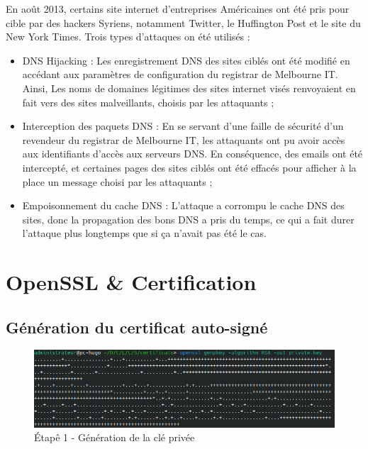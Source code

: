 \documentclass[12pt,a4paper]{article}
\begin{document}
	En août 2013, certains site internet d'entreprises Américaines ont été pris pour cible par des hackers Syriens, notamment Twitter, le Huffington Post et le site du New York Times. Trois types d'attaques on été utilisés : \\
	
	\begin{itemize}
		\item DNS Hijacking : Les enregistrement DNS des sites ciblés ont été modifié en accédant aux paramètres de configuration du registrar de Melbourne IT. Ainsi, Les noms de domaines légitimes des sites internet visés renvoyaient en fait vers des sites malveillants, choisis par les attaquants ; \\
		\item Interception des paquets DNS : En se servant d'une faille de sécurité d'un revendeur du registrar de Melbourne IT, les attaquants ont pu avoir accès aux identifiants d'accès aux serveurs DNS. En conséquence, des emails ont été intercepté, et certaines pages des sites ciblés ont été effacés pour afficher à la place un message choisi par les attaquants ; \\
		\item Empoisonnement du cache DNS : L'attaque a corrompu le cache DNS des sites, donc la propagation des bons DNS a pris du temps, ce qui a fait durer l'attaque plus longtemps que si ça n'avait pas été le cas. \\
	\end{itemize}

	
\newpage

\section{OpenSSL \& Certification}

	\subsection{Génération du certificat auto-signé}

\begin{figure}[!h]
	\begin{center}
		\includegraphics[scale=.85]{generation_key.png}
		\caption{Étapê 1 - Génération de la clé privée} 
	\end{center}
\end{figure}	
\end{document}
